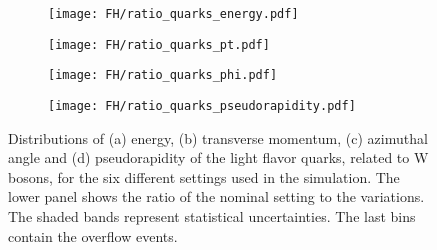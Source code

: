 \begin{figure}[H]
    \centering
    \begin{subfigure}{0.49\textwidth}
        \centering
        \texttt{[image: FH/ratio\_quarks\_energy.pdf]}
        \caption{}
        \label{app:subfig:E(quarks)_FH}
    \end{subfigure}
    \begin{subfigure}{0.49\textwidth}
        \centering
        \texttt{[image: FH/ratio\_quarks\_pt.pdf]}
        \caption{}
        \label{app:subfig:pt(quarks)_FH}
    \end{subfigure}

    \vspace{0.2cm}
    
    \begin{subfigure}{0.49\textwidth}
        \centering
        \texttt{[image: FH/ratio\_quarks\_phi.pdf]}
        \caption{}
        \label{app:subfig:phi(quarks)_FH}
    \end{subfigure}
    \begin{subfigure}{0.49\textwidth}
        \centering
        \texttt{[image: FH/ratio\_quarks\_pseudorapidity.pdf]}
        \caption{}
        \label{app:subfig:eta(quarks)_FH}
    \end{subfigure}
    \caption{Distributions of (a) energy, (b) transverse momentum,  (c) azimuthal angle and (d) pseudorapidity of the light flavor quarks, related to W bosons, for the six different settings used in the simulation. The lower panel shows the ratio of the nominal setting to the variations. The shaded bands represent statistical uncertainties. The last bins contain the overflow events.}
    \label{app:fig:quarks_FH}
\end{figure}


